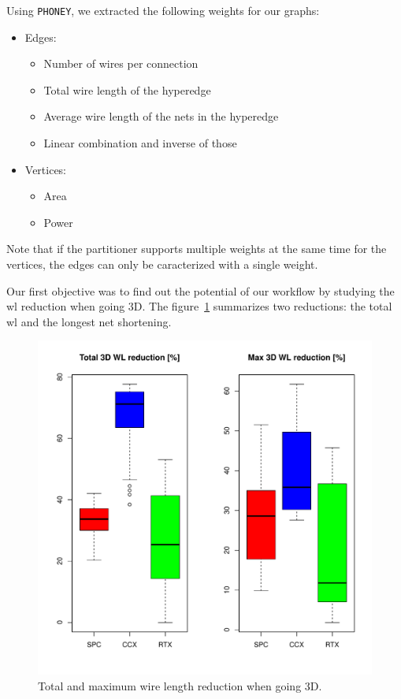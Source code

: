 \documentclass[11pt,a4paper]{report} %
\theoremstyle{customdef}
\begin{document}
Using \texttt{PHONEY}, we extracted the following weights for our graphs:
\begin{itemize}
	\item Edges:
	\begin{itemize}
		\item Number of wires per connection
		\item Total wire length of the hyperedge
		\item Average wire length of the nets in the hyperedge
		\item Linear combination and inverse of those
	\end{itemize}
	\item Vertices:
	\begin{itemize}
		\item Area
		\item Power
	\end{itemize}
\end{itemize}

Note that if the partitioner supports multiple weights at the same time for the vertices, the edges can only be caracterized with a single weight.

Our first objective was to find out the potential of our workflow by studying the \gls{wl} reduction when going 3D.
The figure~\ref{fig:res-3dwl} summarizes two reductions: the total \gls{wl} and the longest net shortening.

\begin{figure}[!h]
\centering
\includegraphics[width=.8\textwidth]{img/3DWL.pdf}
\caption{Total and maximum wire length reduction when going 3D.}
\label{fig:res-3dwl}
\end{figure}
\end{document}
